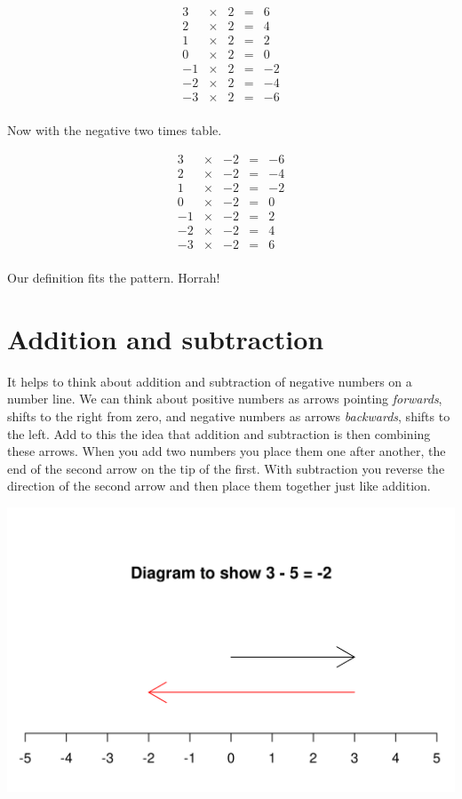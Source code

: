 \documentclass[
  a4paper,
]{scrbook}
\begin{document}
\[
\begin{array}{ccccc}
3 &\times& 2& =& 6\\
2 &\times& 2& =& 4\\
1 &\times& 2& =& 2\\
0 &\times& 2& =& 0\\ 
-1 &\times& 2& =& -2\\
-2 &\times& 2& =& -4\\
-3 &\times& 2& =& -6\\ 
\end{array}
\]

Now with the negative two times table.

\[
\begin{array}{ccccc}
3 &\times& -2& =& -6\\
2 &\times& -2& =& -4\\
1 &\times& -2& =& -2\\
0 &\times& -2& =& 0\\ 
-1 &\times& -2& =& 2\\
-2 &\times& -2& =& 4\\
-3 &\times& -2& =& 6\\ 
\end{array}
\]

Our definition fits the pattern. Horrah!

\hypertarget{addition-and-subtraction}{%
\section{Addition and subtraction}\label{addition-and-subtraction}}

It helps to think about addition and subtraction of negative numbers on
a number line. We can think about positive numbers as arrows pointing
\emph{forwards}, shifts to the right from zero, and negative numbers as
arrows \emph{backwards}, shifts to the left. Add to this the idea that
addition and subtraction is then combining these arrows. When you add
two numbers you place them one after another, the end of the second
arrow on the tip of the first. With subtraction you reverse the
direction of the second arrow and then place them together just like
addition.

\includegraphics{./01-negative_numbers_files/figure-pdf/unnamed-chunk-4-1.png}
\end{document}
